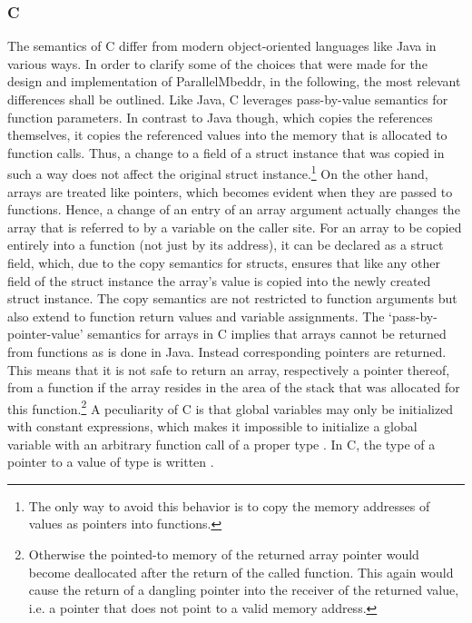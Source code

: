 \subsubsection{C}
\label{cBasics}
The semantics of C differ from modern object-oriented languages like Java in various ways. In order to clarify some of the choices that were made for the design and implementation of ParallelMbeddr, in the following, the most relevant differences shall be outlined. Like Java, C leverages pass-by-value semantics for function parameters. In contrast to Java though, which copies the references themselves, it copies the referenced values into the memory that is allocated to function calls. Thus, a change to a field of a struct instance that was copied in such a way does not affect the original struct instance.\footnote{The only way to avoid this behavior is to copy the memory addresses of values as pointers into functions.} On the other hand, arrays are treated like pointers, which becomes evident when they are passed to functions. Hence, a change of an entry of an array argument actually changes the array that is referred to by a variable on the caller site. For an array to be copied entirely into a function (not just by its address), it can be declared as a struct field, which, due to the copy semantics for structs, ensures that like any other field of the struct instance the array's value is copied into the newly created struct instance. The copy semantics are not restricted to function arguments but also extend to function return values and variable assignments. The `pass-by-pointer-value' semantics for arrays in C implies that arrays cannot be returned from functions as is done in Java. Instead corresponding pointers are returned. This means that it is not safe to return an array, respectively a pointer thereof, from a function if the array resides in the area of the stack that was allocated for this function.\footnote{Otherwise the pointed-to memory of the returned array pointer would become deallocated after the return of the called function. This again would cause the return of a dangling pointer into the receiver of the returned value, i.e. a pointer that does not point to a valid memory address.} 
A peculiarity of C is that global variables may only be initialized with constant expressions, which makes it impossible to initialize a global variable with an arbitrary function call of a proper type \cite[p.~48]{CForBASICProgrammers}. In C, the type of a pointer to a value of type  is written .


